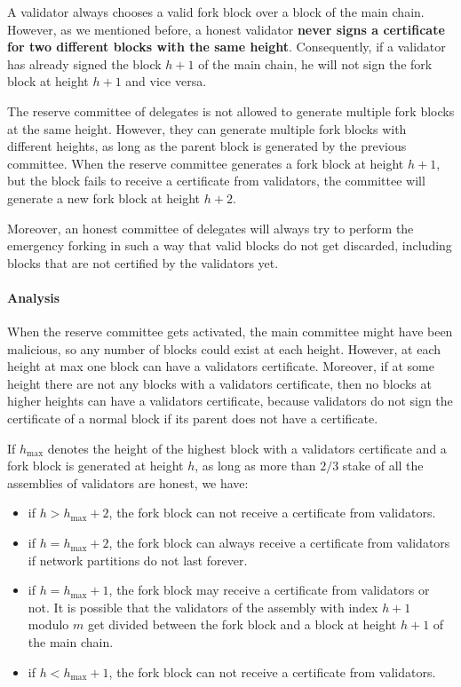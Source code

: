 A validator always chooses a valid fork block over a block of the main chain. However, as we mentioned before,
a honest validator \textbf{never signs a certificate for two different blocks with the same height}. Consequently, if a
validator has already signed the block $h+1$ of the main chain, he will not sign the fork block at height $h+1$ and
vice versa.

The reserve committee of delegates is not allowed to generate multiple fork blocks at the same height. However, they
can generate multiple fork blocks with different heights, as long as the parent block is generated by the previous
committee. When the reserve committee generates a fork block at height $h+1$, but the block fails to receive a
certificate from validators, the committee will generate a new fork block at height $h+2$.

Moreover, an honest committee of delegates will always try to perform the emergency forking in such a way that
valid blocks do not get discarded, including blocks that are not certified by the validators yet.

\paragraph{Analysis}

When the reserve committee gets activated, the main committee might have been malicious, so any number of blocks could
exist at each height. However, at each height at max one block can have a validators certificate. Moreover, if at some
height there are not any blocks with a validators certificate, then no blocks at higher heights can have a
validators certificate, because validators do not sign the certificate of a normal block if its parent does
not have a certificate.

If $h_{\max}$ denotes the height of the highest block with a validators certificate and a fork block is generated at
height $h$, as long as more than $2/3$ stake of all the assemblies of validators are honest, we have:
\begin{itemize}
    \item if $h > h_{\max} + 2$, the fork block can not receive a certificate from validators.
    \item if $h = h_{\max} + 2$, the fork block can always receive a certificate from validators if network
    partitions do not last forever.
    \item if $h = h_{\max} + 1$, the fork block may receive a certificate from validators or not. It is possible that
    the validators of the assembly with index $h+1$ modulo $m$ get divided between the fork block and a block at
    height $h+1$ of the main chain.
    \item if $h < h_{\max} + 1$, the fork block can not receive a certificate from validators.
\end{itemize}

